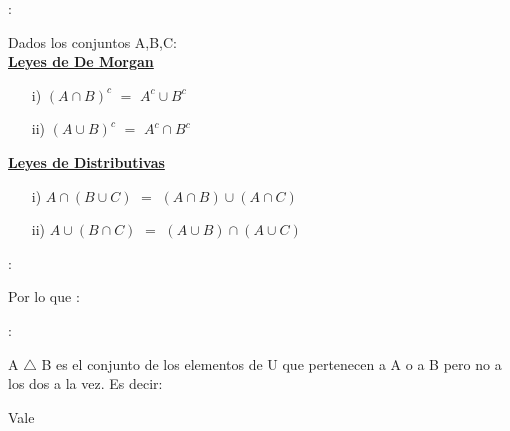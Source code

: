 \documentclass[10pt]{article}
\begin{document}
\begin{propo}:

Dados los conjuntos A,B,C:
\\
\underline{\textbf{Leyes de De Morgan}}
\begin{itemize}
\item[i)] $(A \cap B)^c$ $=$ $A^c \cup B^c$

\item[ii)] $(A \cup B)^c$ $=$ $A^c \cap B^c$
\end{itemize}

\underline{\textbf{Leyes de Distributivas}}
\begin{itemize}
\item[i)] $A \cap (B \cup C)$ $=$ $(A \cap B) \cup (A \cap C)$

\item[ii)] $A \cup (B \cap C)$ $=$ $(A \cup B) \cap (A \cup C)$
\end{itemize}
\end{propo}
\begin{defi}[Diferencia]:

\begin{center}
\end{center}

Por lo que :
\begin{center}
\end{center}


\end{defi}

\begin{defi}:

A $\triangle$ B es el conjunto de los elementos de U
que pertenecen a A o a B pero no a los dos a la vez. Es decir:
\begin{center}

\end{center}
Vale
\begin{center}
\end{center}
\end{defi}
\end{document}
